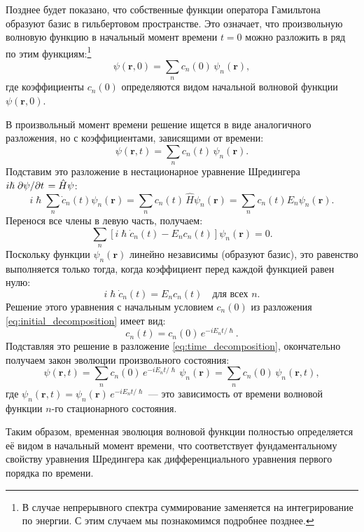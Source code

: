 \documentclass[a4paper, 12pt]{article}
\begin{document}
Позднее будет показано, что собственные функции оператора Гамильтона образуют базис в гильбертовом пространстве. Это означает, что произвольную волновую функцию в начальный момент времени $t=0$ можно разложить в ряд по этим функциям:\footnote{В случае непрерывного спектра суммирование заменяется на интегрирование по энергии. С этим случаем мы познакомимся подробнее позднее.}
\begin{equation}
\psi(\bm{r}, 0) = \sum_n c_n(0) \, \psi_n(\bm{r}),
\label{eq:initial_decomposition}
\end{equation}
где коэффициенты $c_n(0)$ определяются видом начальной волновой функции $\psi(\bm{r}, 0)$.

В произвольный момент времени решение ищется в виде аналогичного разложения, но с коэффициентами, зависящими от времени:
\begin{equation}
\psi(\bm{r}, t) = \sum_n c_n(t) \, \psi_n(\bm{r}).
\label{eq:time_decomposition}
\end{equation}
Подставим это разложение в нестационарное уравнение Шредингера $i\hslash \pdv*{\psi}{t} = \hat{H}\psi$:
\begin{equation}
i\hslash \sum_n \dot{c}_n(t) \psi_n(\bm{r}) = \sum_n c_n(t) \, \hat{H}\psi_n(\bm{r}) = \sum_n c_n(t) E_n \psi_n(\bm{r}).
\end{equation}
Перенося все члены в левую часть, получаем:
\begin{equation}
\sum_n \left[ i\hslash \dot{c}_n(t) - E_n c_n(t) \right] \psi_n(\bm{r}) = 0.
\end{equation}
Поскольку функции $\psi_n(\bm{r})$ линейно независимы (образуют базис), это равенство выполняется только тогда, когда коэффициент перед каждой функцией равен нулю:
\begin{equation}
i\hslash \dot{c}_n(t) = E_n c_n(t) \quad \text{для всех } n.
\end{equation}
Решение этого уравнения с начальным условием $c_n(0)$ из разложения \eqref{eq:initial_decomposition} имеет вид:
\begin{equation}
c_n(t) = c_n(0) \, e^{-i E_n t / \hslash}.
\end{equation}
Подставляя это решение в разложение \eqref{eq:time_decomposition}, окончательно получаем закон эволюции произвольного состояния:
\begin{equation}
\psi(\bm{r}, t) = \sum_n c_n(0) \, e^{-i E_n t / \hslash} \, \psi_n(\bm{r}) = \sum_n c_n(0) \, \psi_n(\bm{r}, t),
\end{equation}
где $\psi_n(\bm{r}, t) = \psi_n(\bm{r}) \, e^{-i E_n t / \hslash}$ --- это зависимость от времени волновой функции $n$-го стационарного состояния.

Таким образом, временная эволюция волновой функции полностью определяется её
видом в начальный момент времени, что соответствует фундаментальному
свойству уравнения Шредингера как дифференциального уравнения первого порядка по
времени.
\end{document}
